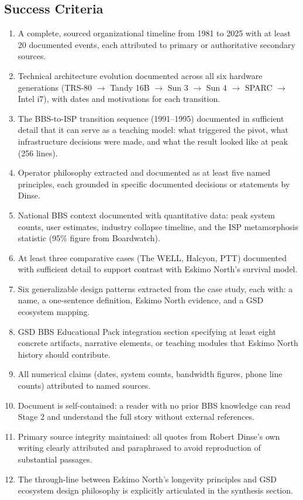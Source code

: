 \documentclass[11pt,letterpaper]{article}
\begin{document}
\subsection{Success Criteria}

\begin{enumerate}
  \item A complete, sourced organizational timeline from 1981 to 2025 with at least 20 documented events, each attributed to primary or authoritative secondary sources.
  \item Technical architecture evolution documented across all six hardware generations (TRS-80 $\rightarrow$ Tandy 16B $\rightarrow$ Sun 3 $\rightarrow$ Sun 4 $\rightarrow$ SPARC $\rightarrow$ Intel i7), with dates and motivations for each transition.
  \item The BBS-to-ISP transition sequence (1991--1995) documented in sufficient detail that it can serve as a teaching model: what triggered the pivot, what infrastructure decisions were made, and what the result looked like at peak (256 lines).
  \item Operator philosophy extracted and documented as at least five named principles, each grounded in specific documented decisions or statements by Dinse.
  \item National BBS context documented with quantitative data: peak system counts, user estimates, industry collapse timeline, and the ISP metamorphosis statistic (95\% figure from Boardwatch).
  \item At least three comparative cases (The WELL, Halcyon, PTT) documented with sufficient detail to support contrast with Eskimo North's survival model.
  \item Six generalizable design patterns extracted from the case study, each with: a name, a one-sentence definition, Eskimo North evidence, and a GSD ecosystem mapping.
  \item GSD BBS Educational Pack integration section specifying at least eight concrete artifacts, narrative elements, or teaching modules that Eskimo North history should contribute.
  \item All numerical claims (dates, system counts, bandwidth figures, phone line counts) attributed to named sources.
  \item Document is self-contained: a reader with no prior BBS knowledge can read Stage 2 and understand the full story without external references.
  \item Primary source integrity maintained: all quotes from Robert Dinse's own writing clearly attributed and paraphrased to avoid reproduction of substantial passages.
  \item The through-line between Eskimo North's longevity principles and GSD ecosystem design philosophy is explicitly articulated in the synthesis section.
\end{enumerate}
\end{document}
